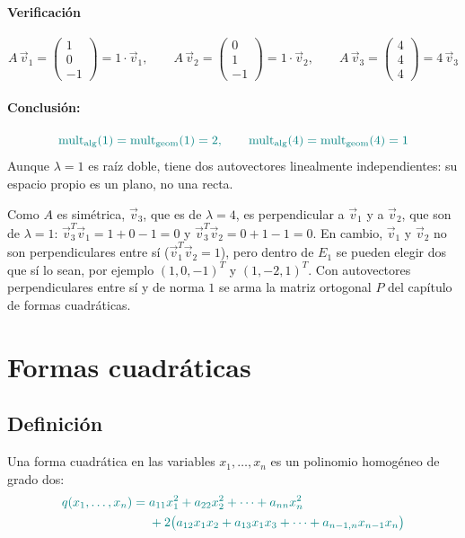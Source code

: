 \documentclass{article}
\newcommand{\vect}[1]{\vec{#1}}
\begin{document}
\paragraph*{Verificación}
\[
A\,\vect{v}_1=\begin{pmatrix}1\\0\\-1\end{pmatrix}=1\cdot\vect{v}_1,
\qquad
A\,\vect{v}_2=\begin{pmatrix}0\\1\\-1\end{pmatrix}=1\cdot\vect{v}_2,
\qquad
A\,\vect{v}_3=\begin{pmatrix}4\\4\\4\end{pmatrix}=4\,\vect{v}_3
\]

\paragraph*{Conclusión:}
\[\color{teal}
\mathrm{mult}_{\mathrm{alg}}(1)=\mathrm{mult}_{\mathrm{geom}}(1)=2,
\qquad
\mathrm{mult}_{\mathrm{alg}}(4)=\mathrm{mult}_{\mathrm{geom}}(4)=1
\]
Aunque \(\lambda=1\) es raíz doble, tiene dos autovectores linealmente independientes: su espacio propio es un plano, no una recta.

Como \(A\) es simétrica, \(\vect{v}_3\), que es de \(\lambda=4\), es perpendicular a \(\vect{v}_1\) y a \(\vect{v}_2\), que son de \(\lambda=1\): \(\vect{v}_3^T\vect{v}_1=1+0-1=0\) y \(\vect{v}_3^T\vect{v}_2=0+1-1=0\). En cambio, \(\vect{v}_1\) y \(\vect{v}_2\) no son perpendiculares entre sí (\(\vect{v}_1^T\vect{v}_2=1\)), pero dentro de \(E_1\) se pueden elegir dos que sí lo sean, por ejemplo \((1,0,-1)^T\) y \((1,-2,1)^T\). Con autovectores perpendiculares entre sí y de norma \(1\) se arma la matriz ortogonal \(P\) del capítulo de formas cuadráticas.

\newpage

\section{Formas cuadráticas}


\subsection*{Definición}
Una forma cuadrática en las variables \(x_1,\dots,x_n\) es un polinomio homogéneo de grado dos:
\[\color{teal}
\begin{aligned}
q(x_1,\dots,x_n)
={}& a_{11}x_1^2 + a_{22}x_2^2 + \cdots + a_{nn}x_n^2\\
&+ 2\bigl(a_{12}x_1x_2 + a_{13}x_1x_3 + \cdots + a_{n-1,n}x_{n-1}x_n\bigr)
\end{aligned}
\]
\end{document}
